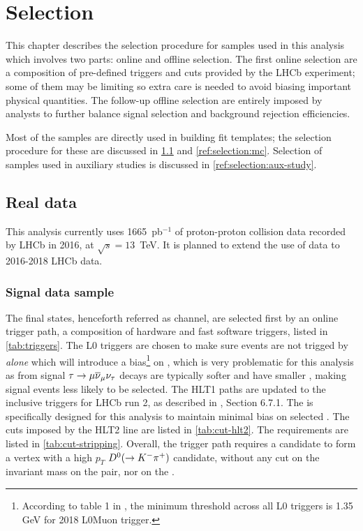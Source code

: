 \chapter{Selection}
\label{ref:selection}

This chapter describes the selection procedure for samples used in this
analysis which involves two parts: online and offline selection.
The first online selection are a composition of
pre-defined triggers and cuts provided by the LHCb experiment;
some of them may be limiting so extra care is needed to avoid biasing important
physical quantities.
The follow-up offline selection are entirely imposed by analysts
to further balance signal selection and background rejection efficiencies.

Most of the samples are directly used in building fit templates;
the selection procedure for these are discussed in \cref{ref:selection:data} and
\cref{ref:selection:mc}.
Selection of samples used in auxiliary studies is discussed in
\cref{ref:selection:aux-study}.


\section{Real data}
\label{ref:selection:data}

This analysis currently uses 1665~pb$^{-1}$ of proton-proton collision data
recorded by LHCb in 2016, at $\sqrt{s} = 13$~TeV.
It is planned to extend the use of data to 2016-2018 LHCb data.


\subsection{Signal data sample}

The \Dz\mun final states, henceforth referred as \Dz channel, are selected first
by an online trigger path,
a composition of hardware and fast software triggers,
listed in \cref{tab:triggers}.
The L0 triggers are chosen to make sure events are not trigged by \muon
\emph{alone} which will introduce a \pt bias\footnote{
    According to table 1 in \cite{LHCb-DP-2019-001},
    the minimum \pt threshold across all L0 triggers is 1.35 GeV for 2018
    L0Muon trigger.
} on \muon,
which is very problematic for this analysis as \muon from signal
${\tau} \rightarrow {\ensuremath{\mu}} {\ensuremath{{\overline{\nu}}_\mu}} {\ensuremath{{\nu}_\tau}}$ decays are typically softer and
have smaller \pt,
making signal events less likely to be selected.
The HLT1 paths are updated to the inclusive triggers for LHCb run 2,
as described in \cite{LHCb-INT-2019-025}, Section 6.7.1.
The  is specifically designed for this analysis
to maintain minimal \pt bias on selected \muon.
The cuts imposed by the HLT2 line are listed in \cref{tab:cut-hlt2}.
The  requirements are
listed in \cref{tab:cut-stripping}.
Overall, the trigger path requires a \muon candidate to form a vertex with a
high $p_T$ ${{D}^0} (\rightarrow {\ensuremath{{K}^-}} {\ensuremath{{\pi}^+}})$ candidate, without any cut on the
invariant mass on the \Dz\mupm pair, nor on the \muon \pt.

